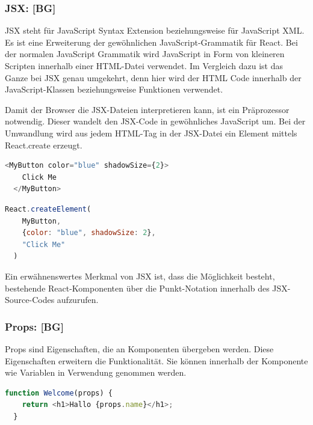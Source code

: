 \newpage

\subsubsection{JSX: [BG]}

JSX steht für JavaScript Syntax Extension beziehungsweise für JavaScript XML. Es ist eine Erweiterung der gewöhnlichen JavaScript-Grammatik für React. Bei der normalen JavaScript Grammatik wird JavaScript in Form von kleineren Scripten innerhalb einer HTML-Datei verwendet. Im Vergleich dazu ist das Ganze bei JSX genau umgekehrt, denn hier wird der HTML Code innerhalb der JavaScript-Klassen beziehungsweise Funktionen verwendet.

Damit der Browser die JSX-Dateien interpretieren kann, ist ein Präprozessor notwendig. Dieser wandelt den JSX-Code in gewöhnliches JavaScript um.
Bei der Umwandlung wird aus jedem HTML-Tag in der JSX-Datei ein Element mittels React.create erzeugt.

\cite{JSX}

\begin{lstlisting}[language=JavaScript, caption=JSX-Code, label=lst:impl:jsx]
  <MyButton color="blue" shadowSize={2}>
    Click Me
  </MyButton>
\end{lstlisting}\cite{JSX}

\begin{lstlisting}[language=JavaScript, caption=JSX-Code in gewöhnliches JavaScript kompiliert, label=lst:impl:jsxInJS]
  React.createElement(
    MyButton,
    {color: "blue", shadowSize: 2},
    "Click Me"
  )
\end{lstlisting}\cite{JSX}

Ein erwähnenswertes Merkmal von JSX ist, dass die Möglichkeit besteht, bestehende React-Komponenten über die Punkt-Notation innerhalb des JSX-Source-Codes aufzurufen.
\cite{JSX}

\subsubsection{Props: [BG]}
Props sind Eigenschaften, die an Komponenten übergeben werden. Diese Eigenschaften erweitern die Funktionalität. Sie können innerhalb der Komponente wie Variablen in Verwendung genommen werden.
\cite{PropsAndComponents} 

\begin{lstlisting}[language=JavaScript, caption=Komponente 'Welcome' die Props 'props' erwartet, label=lst:impl:componentWelcome]
  function Welcome(props) {
    return <h1>Hallo {props.name}</h1>;
  }
\end{lstlisting}\cite{PropsAndComponents}

